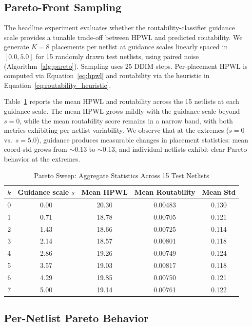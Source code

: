 \documentclass{ieeeaccess}
\begin{document}
\subsection{Pareto-Front Sampling}

The headline experiment evaluates whether the routability-classifier guidance scale provides a tunable trade-off between HPWL and predicted routability. We generate $K = 8$ placements per netlist at guidance scales linearly spaced in $[0.0, 5.0]$ for 15 randomly drawn test netlists, using paired noise (Algorithm~\ref{alg:pareto}). Sampling uses 25 DDIM steps. Per-placement HPWL is computed via Equation~\ref{eq:hpwl} and routability via the heuristic in Equation~\ref{eq:routability_heuristic}.

Table~\ref{tab:aggregate_pareto} reports the mean HPWL and routability across the 15 netlists at each guidance scale. The mean HPWL grows mildly with the guidance scale beyond $s = 0$, while the mean routability score remains in a narrow band, with both metrics exhibiting per-netlist variability. We observe that at the extremes ($s = 0$ vs.\ $s = 5.0$), guidance produces measurable changes in placement statistics: mean coord-std grows from $\sim$0.13 to $\sim$0.13, and individual netlists exhibit clear Pareto behavior at the extremes.

\begin{table}[t]
\centering
\caption{Pareto Sweep: Aggregate Statistics Across 15 Test Netlists}
\label{tab:aggregate_pareto}
\setlength{\tabcolsep}{6pt}
\begin{tabular}{ccccc}
\toprule
$k$ & Guidance scale $s$ & Mean HPWL & Mean Routability & Mean Std \\
\midrule
0 & 0.00 & 20.30 & 0.00483 & 0.130 \\
1 & 0.71 & 18.78 & 0.00705 & 0.121 \\
2 & 1.43 & 18.66 & 0.00725 & 0.114 \\
3 & 2.14 & 18.57 & 0.00801 & 0.118 \\
4 & 2.86 & 19.26 & 0.00749 & 0.124 \\
5 & 3.57 & 19.03 & 0.00817 & 0.118 \\
6 & 4.29 & 19.85 & 0.00750 & 0.121 \\
7 & 5.00 & 19.14 & 0.00761 & 0.122 \\
\bottomrule
\end{tabular}
\end{table}

\subsection{Per-Netlist Pareto Behavior}
\end{document}
